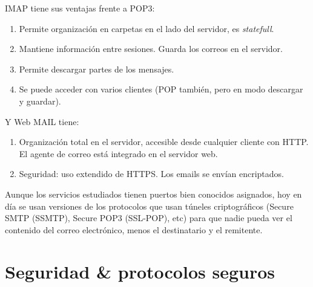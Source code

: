 \documentclass[10pt,a4paper,spanish]{report}
\begin{document}
IMAP tiene sus ventajas frente a POP3:
\begin{enumerate}[\color{tema2}{$\spadesuit$}]
  \item Permite organización en carpetas en el lado del servidor, es \textcolor{tema2}{\textit{statefull}}.
  \item Mantiene información entre sesiones. Guarda los correos en el servidor.
  \item Permite descargar partes de los mensajes.
  \item Se puede acceder con varios clientes (POP también, pero en modo descargar y guardar).
\end{enumerate}

Y Web MAIL tiene:
\begin{enumerate}[\color{tema2}{$\clubsuit$}]
  \item Organización total en el servidor, accesible desde cualquier cliente con HTTP. El agente de correo está integrado en el servidor web.
  \item Seguridad: uso extendido de HTTPS. Los emails se envían encriptados.
\end{enumerate}

Aunque los servicios estudiados tienen puertos bien conocidos asignados, hoy en día se usan versiones de los protocolos que usan túneles criptográficos (Secure SMTP (SSMTP), Secure POP3 (SSL-POP), etc) para que nadie pueda ver el contenido del correo electrónico, menos el destinatario y el remitente.

\section{\textcolor{tema2}Seguridad \& protocolos seguros}
\end{document}
